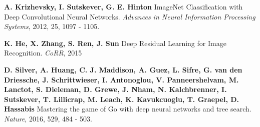 \documentclass{simposium_srb_lat}
\begin{document}
\begin{thebibliography}{99}
\textbf{A. Krizhevsky, I. Sutskever, G. E. Hinton} ImageNet Classification with Deep Convolutional Neural Networks. \emph{Advances in Neural Information Processing Systems}, 2012, 25, 1097 - 1105.

\textbf{K. He, X. Zhang, S. Ren, J. Sun} Deep Residual Learning for Image Recognition. \emph{CoRR}, 2015

\textbf{D. Silver, A. Huang, C. J. Maddison, A. Guez, L. Sifre, G. van den Driessche, J. Schrittwieser, I. Antonoglou, V. Panneershelvam, M. Lanctot,
S. Dieleman, D. Grewe, J. Nham, N. Kalchbrenner, I. Sutskever, T. Lillicrap, M. Leach, K. Kavukcuoglu, T. Graepel, D. Hassabis }
Mastering the game of Go with deep neural networks and tree search. \emph{Nature}, 2016, 529, 484 - 503.

\end{thebibliography}
\end{document}
